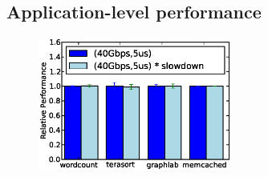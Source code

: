 \subsection{Application-level performance}
\label{ssec:alp}

%
\begin{figure}
  \centering
    \includegraphics[width = 2.5in]{img/slowdown.eps} 
  \caption{\small{}}
  \label{fig:appfabric}
\end{figure}
%
